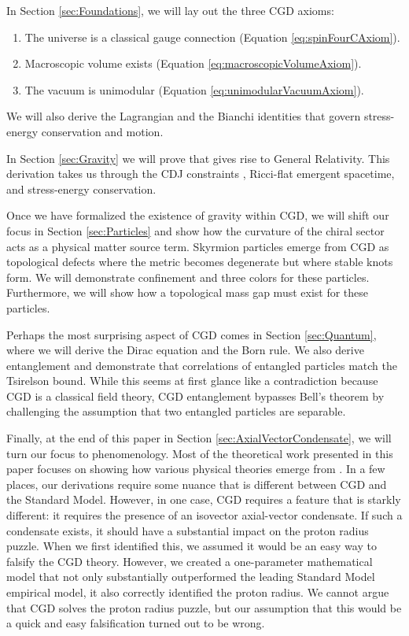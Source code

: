 In Section \ref{sec:Foundations}, we will lay out the three CGD axioms:
\begin{enumerate}[label=\textbf{Axiom \arabic*:}, ref=\arabic*, labelindent=\parindent, leftmargin=*]
    \item \label{ax:spinFourCAxiom} The universe is a classical \spinFourC gauge connection (Equation \ref{eq:spinFourCAxiom}).
    \item \label{ax:macroscopicVolumeAxiom} Macroscopic volume exists (Equation \ref{eq:macroscopicVolumeAxiom}).
    \item \label{ax:unimodularVacuumAxiom} The vacuum is unimodular (Equation \ref{eq:unimodularVacuumAxiom}).
\end{enumerate}
\noindent We will also derive the Lagrangian and the Bianchi identities that govern stress-energy conservation and motion.

In Section \ref{sec:Gravity} we will prove that \spinFourC gives rise to General Relativity. This derivation takes us through the CDJ constraints \citep{capovilla1991pure}, Ricci-flat emergent spacetime, and stress-energy conservation.

Once we have formalized the existence of gravity within CGD, we will shift our focus in Section \ref{sec:Particles} and show how the curvature of the \slTwoCR chiral sector acts as a physical matter source term. Skyrmion particles \citep{skyrme1962unified} emerge from CGD as topological defects where the metric becomes degenerate but where stable knots form. We will demonstrate confinement and three colors for these particles. Furthermore, we will show how a topological mass gap must exist for these particles.

Perhaps the most surprising aspect of CGD comes in Section \ref{sec:Quantum}, where we will derive the Dirac equation and the Born rule. We also derive entanglement and demonstrate that correlations of entangled particles match the Tsirelson bound. While this seems at first glance like a contradiction because CGD is a classical field theory, CGD entanglement bypasses Bell's theorem by challenging the assumption that two entangled particles are separable.

Finally, at the end of this paper in Section \ref{sec:AxialVectorCondensate}, we will turn our focus to phenomenology. Most of the theoretical work presented in this paper focuses on showing how various physical theories emerge from \spinFourC. In a few places, our derivations require some nuance that is different between CGD and the Standard Model. However, in one case, CGD requires a feature that is starkly different: it requires the presence of an isovector axial-vector condensate. If such a condensate exists, it should have a substantial impact on the proton radius puzzle. When we first identified this, we assumed it would be an easy way to falsify the CGD theory. However, we created a one-parameter mathematical model that not only substantially outperformed the leading Standard Model empirical model, it also correctly identified the proton radius. We cannot argue that CGD solves the proton radius puzzle, but our assumption that this would be a quick and easy falsification turned out to be wrong.

